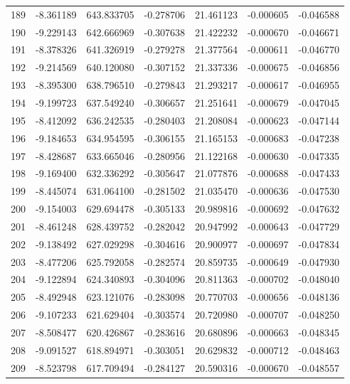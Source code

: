 \begin{tabular}{rrrrrrr}
 189 &  -8.361189 &  643.833705 & -0.278706 &  21.461123 &  -0.000605 & -0.046588 \\
 190 &  -9.229143 &  642.666969 & -0.307638 &  21.422232 &  -0.000670 & -0.046671 \\
 191 &  -8.378326 &  641.326919 & -0.279278 &  21.377564 &  -0.000611 & -0.046770 \\
 192 &  -9.214569 &  640.120080 & -0.307152 &  21.337336 &  -0.000675 & -0.046856 \\
 193 &  -8.395300 &  638.796510 & -0.279843 &  21.293217 &  -0.000617 & -0.046955 \\
 194 &  -9.199723 &  637.549240 & -0.306657 &  21.251641 &  -0.000679 & -0.047045 \\
 195 &  -8.412092 &  636.242535 & -0.280403 &  21.208084 &  -0.000623 & -0.047144 \\
 196 &  -9.184653 &  634.954595 & -0.306155 &  21.165153 &  -0.000683 & -0.047238 \\
 197 &  -8.428687 &  633.665046 & -0.280956 &  21.122168 &  -0.000630 & -0.047335 \\
 198 &  -9.169400 &  632.336292 & -0.305647 &  21.077876 &  -0.000688 & -0.047433 \\
 199 &  -8.445074 &  631.064100 & -0.281502 &  21.035470 &  -0.000636 & -0.047530 \\
 200 &  -9.154003 &  629.694478 & -0.305133 &  20.989816 &  -0.000692 & -0.047632 \\
 201 &  -8.461248 &  628.439752 & -0.282042 &  20.947992 &  -0.000643 & -0.047729 \\
 202 &  -9.138492 &  627.029298 & -0.304616 &  20.900977 &  -0.000697 & -0.047834 \\
 203 &  -8.477206 &  625.792058 & -0.282574 &  20.859735 &  -0.000649 & -0.047930 \\
 204 &  -9.122894 &  624.340893 & -0.304096 &  20.811363 &  -0.000702 & -0.048040 \\
 205 &  -8.492948 &  623.121076 & -0.283098 &  20.770703 &  -0.000656 & -0.048136 \\
 206 &  -9.107233 &  621.629404 & -0.303574 &  20.720980 &  -0.000707 & -0.048250 \\
 207 &  -8.508477 &  620.426867 & -0.283616 &  20.680896 &  -0.000663 & -0.048345 \\
 208 &  -9.091527 &  618.894971 & -0.303051 &  20.629832 &  -0.000712 & -0.048463 \\
 209 &  -8.523798 &  617.709494 & -0.284127 &  20.590316 &  -0.000670 & -0.048557 \\

\end{tabular}
